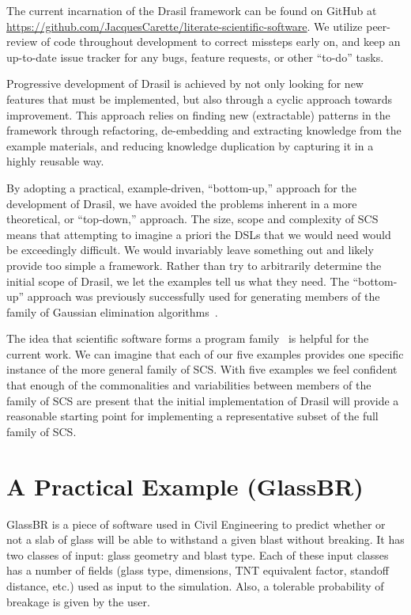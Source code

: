 \documentclass[sigconf]{acmart}
\begin{document}
The current incarnation of the Drasil framework can be found on GitHub at 
\href{https://github.com/JacquesCarette/literate-scientific-software}
{https://github.com/JacquesCarette/literate-scientific-software}. We utilize 
peer-review of code throughout development to correct missteps early on, and 
keep an up-to-date issue tracker for any bugs, feature requests, or other 
``to-do'' tasks.

Progressive development of Drasil is achieved by not only looking for new 
features that must be implemented, but also through a cyclic approach towards 
improvement. This approach relies on finding new (extractable) patterns in the 
framework through refactoring, de-embedding and extracting knowledge from the 
example materials, and reducing knowledge duplication by capturing it in a 
highly reusable way.

By adopting a practical, example-driven, ``bottom-up,'' approach for the
development of Drasil, we have avoided the problems inherent in a more
theoretical, or ``top-down,'' approach.  The size, scope and complexity of SCS
means that attempting to imagine a priori the DSLs that we would need would be
exceedingly difficult.  We would invariably leave something out and likely
provide too simple a framework.  Rather than try to arbitrarily determine the
initial scope of Drasil, we let the examples tell us what they need. The
``bottom-up'' approach was previously successfully used for generating members
of the family of Gaussian elimination algorithms~\cite{Carette2006}.  

The idea that scientific software forms a program
family~\cite{SmithMcCutchanAndCao2007} is helpful for the current work.  We can
imagine that each of our five examples provides one specific instance of the
more general family of SCS.  With five examples we feel confident that enough of
the commonalities and variabilities between members of the family of SCS are
present that the initial implementation of Drasil will provide a reasonable
starting point for implementing a representative subset of the full family of
SCS.

\section{A Practical Example (GlassBR)} \label{SecGlassBR}

GlassBR is a piece of software used in Civil Engineering to predict whether or 
not a slab of glass will be able to withstand a given blast without breaking. It
has two classes of input: glass geometry and blast type. Each of these input 
classes has a number of fields (glass type, dimensions, TNT equivalent factor, 
standoff distance, etc.) used as input to the simulation. Also, a tolerable 
probability of breakage is given by the user.
\end{document}
